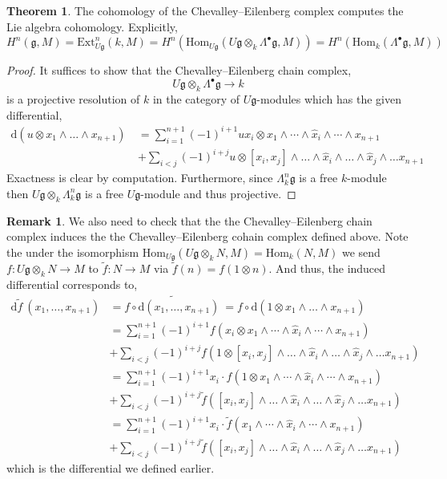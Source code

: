 \documentclass[12pt]{extarticle}
\newcommand{\Hom}[3]{\mathrm{Hom}_{#1}\left( #2, #3 \right)}
\renewcommand{\d}[1]{ \mathrm{d}#1 \:}
\theoremstyle{definition}
\newtheorem{theorem}{Theorem}[section]
\newtheorem{remark}{Remark}
\newcommand{\Ext}[4]{\mathrm{Ext}^{#1}_{#2} \left( #3, #4 \right)}
\newcommand{\g}{\mathfrak{g}}
\begin{document}
\begin{theorem}
The cohomology of the Chevalley–Eilenberg complex computes the Lie algebra cohomology. Explicitly,
\[ H^n(\g, M) = \Ext{n}{U \g}{k}{M} = H^n(\Hom{U\g}{U\g \otimes_k \Lambda^\bullet \g}{M}) = H^n(\Hom{k}{\Lambda^\bullet \g}{M}) \]
\end{theorem}

\begin{proof}
It suffices to show that the Chevalley–Eilenberg chain complex,
\[ U \g \otimes_k \Lambda^\bullet \g \to k \]
is a projective resolution of $k$ in the category of $U \g$-modules which has the given differential,
\begin{align*}
\d{(u \otimes x_1 \wedge \dots \wedge x_{n+1})} & = \sum_{i = 1}^{n+1} (-1)^{i+1} u x_i \otimes x_1 \wedge \cdots \wedge \hat{x}_i \wedge \cdots \wedge x_{n+1} 
\\
& + \sum_{i < j} (-1)^{i + j} u \otimes [x_i, x_j] \wedge \dots \wedge \hat{x}_i \wedge \dots \wedge \hat{x}_j \wedge \dots x_{n+1}
\end{align*} 
Exactness is clear by computation. Furthermore, since $\Lambda^n_k \g$ is a free $k$-module then $U \g \otimes_k \Lambda^n_k \g$ is a free $U \g$-module and thus projective. 
\end{proof}

\begin{remark}
We also need to check that the the Chevalley–Eilenberg chain complex induces the the Chevalley–Eilenberg cohain complex defined above. Note the under the isomorphism $\Hom{U \g}{U \g \otimes_k N}{M} = \Hom{k}{N}{M}$ we send $f : U \g \otimes_k N \to M$ to $\tilde{f} : N \to M$ via $\tilde{f}(n) = f(1 \otimes n)$. And thus, the induced differential corresponds to,
\begin{align*}
\d{\tilde{f}}(x_1, \dots, x_{n+1}) & = \widetilde{f \circ \d{(x_1, \dots, x_{n+1})}} = f \circ \d{(1 \otimes x_1 \wedge \dots \wedge x_{n+1})} 
\\
& = \sum_{i = 1}^{n+1} (-1)^{i+1} f(x_i \otimes x_1 \wedge \cdots \wedge \hat{x}_i \wedge \cdots \wedge x_{n+1})
\\
& + \sum_{i < j} (-1)^{i + j} f(1 \otimes [x_i, x_j] \wedge \dots \wedge \hat{x}_i \wedge \dots \wedge \hat{x}_j \wedge \dots x_{n+1})
\\
& = \sum_{i = 1}^{n+1} (-1)^{i+1} x_i \cdot f(1 \otimes x_1 \wedge \cdots \wedge \hat{x}_i \wedge \cdots \wedge x_{n+1})
\\
& + \sum_{i < j} (-1)^{i + j} \tilde{f}([x_i, x_j] \wedge \dots \wedge \hat{x}_i \wedge \dots \wedge \hat{x}_j \wedge \dots x_{n+1})
\\
& = \sum_{i = 1}^{n+1} (-1)^{i+1} x_i \cdot \tilde{f}(x_1 \wedge \cdots \wedge \hat{x}_i \wedge \cdots \wedge x_{n+1})
\\
& + \sum_{i < j} (-1)^{i + j} \tilde{f}([x_i, x_j] \wedge \dots \wedge \hat{x}_i \wedge \dots \wedge \hat{x}_j \wedge \dots x_{n+1})
\end{align*}
which is the differential we defined earlier. 
\end{remark}
\end{document}

